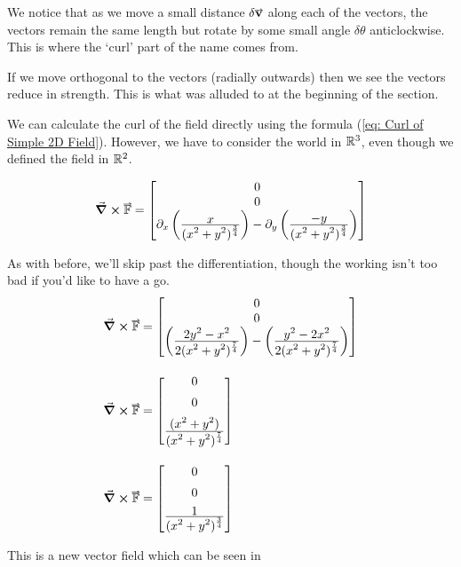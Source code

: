 \documentclass[main.tex]{subfiles}
\begin{document}
                    We notice that as we move a small distance $\delta\vect{v}$ along each of the vectors, the vectors remain the same length but rotate by some small angle $\delta\theta$ anticlockwise. This is where the `curl' part of the name comes from.

                    If we move orthogonal to the vectors (radially outwards) then we see the vectors reduce in strength. This is what was alluded to at the beginning of the section.


                    \vspace{2em}
                    We can calculate the curl of the field directly using the formula (\eqref{eq: Curl of Simple 2D Field}). However, we have to consider the world in $\mathbb{R}^3$, even though we defined the field in $\mathbb{R}^2$.

                    \begin{equation}
                        \curl{\vect{\mathbb{F}}} = \Matrix{0\\0\\\partial_x \left(\bfrac{x}{(x^2 + y^2)^\frac{3}{4}}\right) - \partial_y \left(\bfrac{-y}{(x^2 + y^2)^\frac{3}{4}}\right)}
                        \label{eq: Curl of Simple 2D Field}
                    \end{equation}

                    \newpage
                    As with before, we'll skip past the differentiation, though the working isn't too bad if you'd like to have a go.
                    \begin{align}
                        \curl{\vect{\mathbb{F}}} &= \Matrix{0\\0\\\left(\bfrac{2y^2 - x^2}{2(x^2 + y^2)^\frac{7}{4}}\right) - \left(\bfrac{y^2 - 2x^2}{2(x^2 + y^2)^\frac{7}{4}}\right)}\nonumber\\[1em]
                        \curl{\vect{\mathbb{F}}} &= \Matrix{0\\[0.5em] 0\\[0.5em] \bfrac{(x^2 + y^2)}{(x^2 + y^2)^\frac{7}{4}}}\nonumber\\[1em]
                        \curl{\vect{\mathbb{F}}} &= \Matrix{0\\[0.5em] 0\\[0.5em] \bfrac{1}{(x^2 + y^2)^\frac{3}{4}}} \label{eq: Curl Field of 2D Curling Field}
                    \end{align}

                    \vspace{2em}
                    This is a new vector field which can be seen in 
\end{document}
